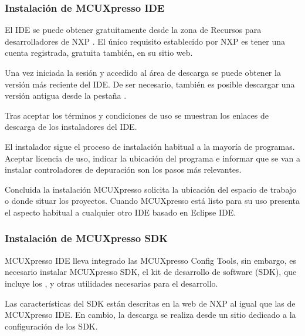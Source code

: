 \subsubsection{Instalación de MCUXpresso IDE} \label{sec:instalacion-mcu}
El IDE se puede obtener gratuitamente desde la zona de Recursos para
desarrolladores de NXP \cite{webpage:mcuxpresso-ide}. El único requisito
establecido por NXP es tener una cuenta registrada, gratuita también, en su
sitio web.

Una vez iniciada la sesión y accedido al área de descarga se puede obtener
la versión más reciente del IDE. De ser necesario, también es posible descargar
una versión antigua desde la pestaña .

Tras aceptar los términos y condiciones de uso se muestran los enlaces de
descarga de los instaladores del IDE. 


El instalador sigue el proceso de instalación habitual a la mayoría de programas.
Aceptar licencia de uso, indicar la ubicación del programa e informar
que se van a instalar controladores de depuración son los pasos más relevantes.

Concluida la instalación MCUXpresso solicita la ubicación del espacio de trabajo
o  donde situar los proyectos. Cuando MCUXpresso
está listo para su uso presenta el aspecto habitual a cualquier otro IDE basado
en Eclipse IDE.


\subsubsection{Instalación de MCUXpresso SDK} \label{sec:instalacion-mcu}
MCUXpresso IDE lleva integrado las MCUXpresso Config Tools, sin embargo, es
necesario instalar MCUXpresso SDK, el kit de desarrollo de software (SDK),
que incluye los ,  y otras
utilidades necesarias para el desarrollo.

Las características del SDK están descritas en la web de NXP
\cite{webpage:mcuxpresso-sdk} al igual que las de MCUXpresso IDE. En cambio,
la descarga se realiza desde un sitio dedicado a la configuración de los SDK.


